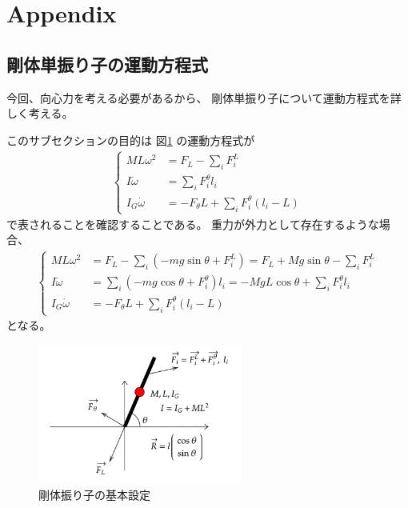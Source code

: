 \documentclass[a4paper,11pt]{jsarticle}
\begin{document}
\clearpage
\section{Appendix}
\label{sec:appendix}
\subsection{剛体単振り子の運動方程式}
今回、向心力を考える必要があるから、
剛体単振り子について運動方程式を詳しく考える。

このサブセクションの目的は
図\ref*{Appendix_base_config.png}
の運動方程式が
\begin{align}
  \begin{cases}
    ML\omega^2  &= F_L - \sum_i F_i^L
    \\
    I\dot\omega &= \sum_i F_i^\theta l_i
    \\
    I_G\dot\omega &= -F_\theta L + \sum_i F_i^\theta ( l_i - L )
  \end{cases}
\end{align}
で表されることを確認することである。
重力が外力として存在するような場合、
\begin{align}
  \begin{cases}
    ML\omega^2  &= F_L - \sum_i ( -mg\sin\theta + F_i^L ) = F_L + Mg\sin\theta - \sum_i F_i^L
    \\
    I\dot\omega &= \sum_i ( -mg\cos\theta + F_i^\theta ) l_i = -MgL\cos\theta + \sum_i F_i^\theta l_i
    \\
    I_G\dot\omega &= -F_\theta L + \sum_i F_i^\theta ( l_i - L )
  \end{cases}
\end{align}
となる。


\begin{figure}[h]
  \centering
  \includegraphics[width = 0.6\textwidth]{Appendix_base_config.png}
  \caption{剛体振り子の基本設定}
  \label{Appendix_base_config.png}
\end{figure}
\end{document}
